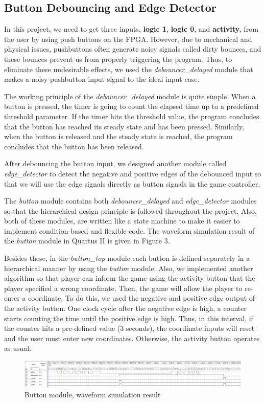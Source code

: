 \documentclass[conference]{IEEEtran}
\begin{document}
\subsection{Button Debouncing and Edge Detector}
In this project, we need to get three inputs, \textbf{logic 1}, \textbf{logic 0}, and \textbf{activity}, from the user by using push buttons on the FPGA. However, due to mechanical and physical issues, pushbuttons often generate noisy signals called dirty bounces, and these bounces prevent us from properly triggering the program. Thus, to eliminate these undesirable effects, we used the \textit{debouncer\_delayed} module that makes a noisy pushbutton input signal to the ideal input case. \\
\par The working principle of the \textit{debouncer\_delayed} module is quite simple. When a button is pressed, the timer is going to count the elapsed time up to a predefined threshold parameter. If the timer hits the threshold value, the program concludes that the button has reached its steady state and has been pressed. Similarly, when the button is released and the steady state is reached, the program concludes that the button has been released. \\
\par After debouncing the button input, we designed another module called \textit{edge\_detector} to detect the negative and positive edges of the debounced input so that we will use the edge signals directly as button signals in the game controller. \\
\par The \textit{button} module contains both \textit{debouncer\_delayed} and \textit{edge\_detector} modules so that the hierarchical design principle is followed throughout the project. Also, both of these modules, are written like a state machine to make it easier to implement condition-based and flexible code. The waveform simulation result of the \textit{button} module in Quartus II is given in Figure 3. \\
\par Besides these, in the \textit{button\_top} module each button is defined separately in a hierarchical manner by using the \textit{button} module. Also, we implemented another algorithm so that player can inform the game using the activity button that the player specified a wrong coordinate. Then, the game will allow the player to re-enter a coordinate. To do this, we used the negative and positive edge output of the activity button. One clock cycle after the negative edge is high, a counter starts counting the time until the positive edge is high. Thus, in this interval, if the counter hits a pre-defined value (3 seconds), the coordinate inputs will reset and the user must enter new coordinates. Otherwise, the activity button operates as usual. 
 \begin{figure}[H]
   \centerline{\includegraphics[scale=0.22]{simulation.png}}
    \caption{Button module, waveform simulation result}
\end{figure} 
\end{document}

